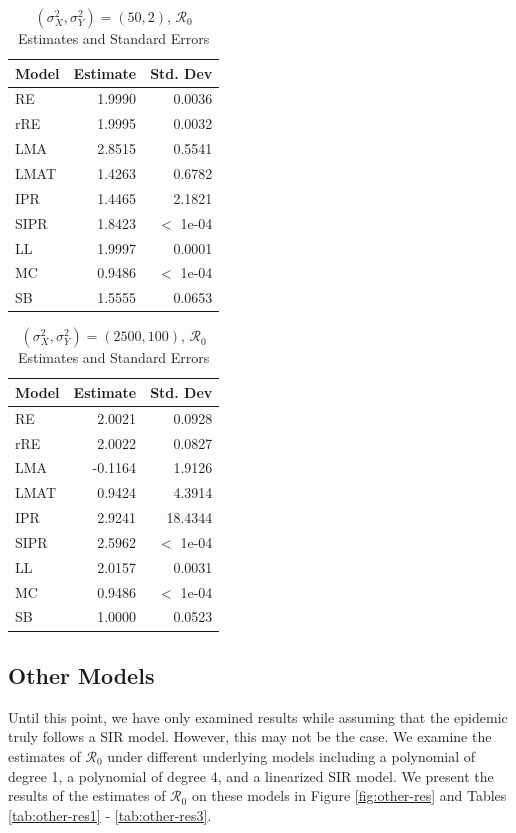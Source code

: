 \documentclass[12pt]{article}
\newcommand{\rr}{\ensuremath{\mathcal{R}_0}}
\begin{document}
\begin{table}[H]
	
	
	\centering
	\begin{tabular}[t]{l|r|r}
		\hline
		Model & Estimate & Std. Dev\\
		\hline
		RE & 1.9990 & 0.0036\\
		\hline
		rRE & 1.9995 & 0.0032\\
		\hline
		LMA & 2.8515 & 0.5541\\
		\hline
		LMAT & 1.4263 & 0.6782\\
		\hline
		IPR & 1.4465 & 2.1821\\
		\hline
		SIPR & 1.8423 & $<$ 1e-04\\
		\hline
		LL & 1.9997 & 0.0001\\
		\hline
		MC & 0.9486 & $<$ 1e-04\\
		\hline
		SB & 1.5555 & 0.0653\\
		\hline
	\end{tabular}
	\caption{ $(\sigma^2_X, \sigma^2_Y) = (50, 2)$, $\rr$ Estimates and Standard Errors}
\end{table}

\begin{table}[H]
	
	
	\centering
	\begin{tabular}[t]{l|r|r}
		\hline
		Model & Estimate & Std. Dev\\
		\hline
		RE & 2.0021 & 0.0928\\
		\hline
		rRE & 2.0022 & 0.0827\\
		\hline
		LMA & -0.1164 & 1.9126\\
		\hline
		LMAT & 0.9424 & 4.3914\\
		\hline
		IPR & 2.9241 & 18.4344\\
		\hline
		SIPR & 2.5962 & $<$ 1e-04\\
		\hline
		LL & 2.0157 & 0.0031\\
		\hline
		MC & 0.9486 & $<$ 1e-04\\
		\hline
		SB & 1.0000 & 0.0523\\
		\hline
	\end{tabular}
	\caption{$(\sigma^2_X, \sigma^2_Y) = (2500, 100)$, $\rr$ Estimates and Standard Errors}
\end{table}

\subsection{Other Models}\label{sec:res-oth}
Until this point, we have only examined results while assuming that the epidemic truly follows a SIR model.  However, this may not be the case.  We examine the estimates of $\rr$ under different underlying models including a polynomial of degree 1, a polynomial of degree 4, and a linearized SIR model.  We present the results of the estimates of $\rr$ on these models in Figure \ref{fig:other-res} and Tables \ref{tab:other-res1} - \ref{tab:other-res3}.
\end{document}
